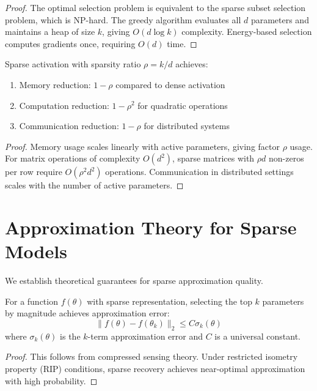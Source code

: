 \begin{proof}
The optimal selection problem is equivalent to the sparse subset selection problem, which is NP-hard. The greedy algorithm evaluates all $d$ parameters and maintains a heap of size $k$, giving $O(d \log k)$ complexity. Energy-based selection computes gradients once, requiring $O(d)$ time.
\end{proof}

\begin{theorem}
\label{thm:memory_efficiency}
Sparse activation with sparsity ratio $\rho = k/d$ achieves:
\begin{enumerate}
\item Memory reduction: $1 - \rho$ compared to dense activation
\item Computation reduction: $1 - \rho^2$ for quadratic operations
\item Communication reduction: $1 - \rho$ for distributed systems
\end{enumerate}
\end{theorem}

\begin{proof}
Memory usage scales linearly with active parameters, giving factor $\rho$ usage. For matrix operations of complexity $O(d^2)$, sparse matrices with $\rho d$ non-zeros per row require $O(\rho^2 d^2)$ operations. Communication in distributed settings scales with the number of active parameters.
\end{proof}

\section{Approximation Theory for Sparse Models}

We establish theoretical guarantees for sparse approximation quality.

\begin{theorem}
\label{thm:sparse_approximation}
For a function $f(\theta)$ with sparse representation, selecting the top $k$ parameters by magnitude achieves approximation error:
$$\|f(\theta) - f(\theta_k)\|_2 \leq C \sigma_k(\theta)$$
where $\sigma_k(\theta)$ is the $k$-term approximation error and $C$ is a universal constant.
\end{theorem}

\begin{proof}
This follows from compressed sensing theory. Under restricted isometry property (RIP) conditions, sparse recovery achieves near-optimal approximation with high probability.
\end{proof}


